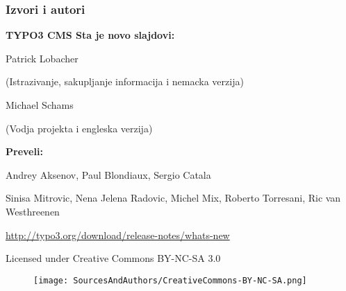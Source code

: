 \begin{frame}[fragile]
	\frametitle{Izvori i autori}

	\vspace{-0.6cm}

	\centerline{\textbf{TYPO3 CMS Sta je novo slajdovi:}}

	\begin{center}
		\smaller
			\centerline{Patrick Lobacher}
			\centerline{(Istrazivanje, sakupljanje informacija i nemacka verzija)}
			\vspace{0.1cm}
			\centerline{Michael Schams}
			\centerline{(Vodja projekta i engleska verzija)}
		\normalsize
	\end{center}
	\vspace{-0.6cm}
	\begin{center}
		\smaller
			\centerline{\textbf{Preveli:}}
			\centerline{Andrey Aksenov, Paul Blondiaux, Sergio Catala}
			\centerline{Sinisa Mitrovic, Nena Jelena Radovic, Michel Mix, Roberto Torresani, Ric van Westhreenen}
		\normalsize
	\end{center}
	\vspace{-0.6cm}
	\smaller\begin{center}\url{http://typo3.org/download/release-notes/whats-new}\end{center}\normalsize

	\smaller\begin{center}Licensed under Creative Commons BY-NC-SA 3.0\end{center}\normalsize
	\begin{figure}\vspace*{-0.3cm}
		\texttt{[image: SourcesAndAuthors/CreativeCommons-BY-NC-SA.png]}
	\end{figure}

\end{frame}

